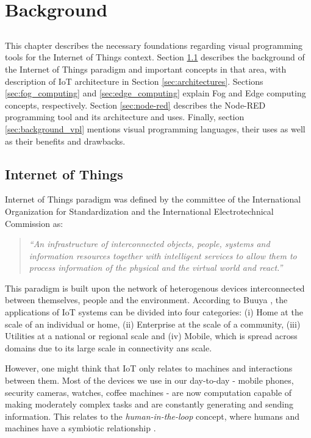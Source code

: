 \chapter{Background} \label{chap:background} \minitoc

\section*{}


This chapter describes the necessary foundations regarding visual programming tools for the Internet of Things context. Section \ref{sec:background_iot} describes the background of the Internet of Things paradigm and important concepts in that area, with description of IoT architecture in Section \ref{sec:architectures}. Sections \ref{sec:fog_computing} and \ref{sec:edge_computing} explain Fog and Edge computing concepts, respectively. Section \ref{sec:node-red} describes the Node-RED programming tool and its architecture and uses. Finally, section \ref{sec:background_vpl} mentions visual programming languages, their uses as well as their benefits and drawbacks.

\section{Internet of Things}\label{sec:background_iot}

Internet of Things paradigm was defined by the committee of the International Organization for Standardization and the International Electrotechnical Commission \cite{ISOIEC} as:
\begin{quote}
    \emph{“An infrastructure of interconnected objects, people, systems and information resources together with intelligent services to allow them to process information of the physical and the virtual world and react.”}
\end{quote}
\par This paradigm is built upon the network of heterogenous devices interconnected between themselves, people and the environment. According to Buuya \cite{iot_future_direction}, the applications of IoT systems can be divided into four categories: (i) Home at the scale of an individual or home, (ii) Enterprise at the scale of a community, (iii) Utilities at a national or regional scale and (iv) Mobile, which is spread across domains due to its large scale in connectivity ans scale. 
\par However, one might think that IoT only relates to machines and interactions between them. Most of the devices we use in our day-to-day - mobile phones, security cameras, watches, coffee machines - are now computation capable of making moderately complex tasks and are constantly generating and sending information. This relates to the \emph{human-in-the-loop} concept, where humans and machines have a symbiotic relationship \cite{human_in_the_loop_survey}.
 
